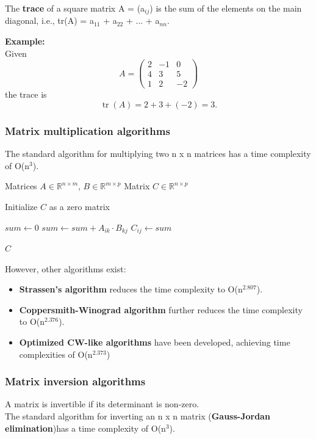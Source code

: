 \noindent
The \textbf{trace} of a square matrix A = (a$_{ij}$) is the sum of the elements on the main diagonal, i.e., tr(A) = a$_{11}$ + a$_{22}$ + ... + a$_{nn}$.
\medskip

\noindent
\textbf{Example:}\\
Given 
\[
A = \begin{pmatrix}
2 & -1 & 0\\
4 & 3 & 5\\
1 & 2 & -2
\end{pmatrix}
\]
the trace is
\[
\operatorname{tr}(A) = 2 + 3 + (-2) = 3.
\]

\subsubsection{Matrix multiplication algorithms}
The standard algorithm for multiplying two n x n matrices has a time complexity of O(n$^3$).
\begin{algorithm}
\caption{Schoolbook Matrix Multiplication}
\begin{algorithmic}[1]

\Require Matrices $A \in \mathbb{R}^{n \times m}$, $B \in \mathbb{R}^{m \times p}$
\Ensure Matrix $C \in \mathbb{R}^{n \times p}$

\State Initialize $C$ as a zero matrix

        \State $sum \gets 0$
            \State $sum \gets sum + A_{ik} \cdot B_{kj}$
        \EndFor
        \State $C_{ij} \gets sum$
    \EndFor
\EndFor

\State \Return $C$

\end{algorithmic}
\end{algorithm}

\noindent
However, other algorithms exist:
\begin{itemize}
    \item \textbf{Strassen's algorithm} reduces the time complexity to O(n$^{2.807}$).\\
    \item \textbf{Coppersmith-Winograd algorithm} further reduces the time complexity to O(n$^{2.376}$).\\
    \item \textbf{Optimized CW-like algorithms} have been developed, achieving time complexities of O(n$^{2.373}$) 
\end{itemize}


\subsubsection{Matrix inversion algorithms}
A matrix is invertible if its determinant is non-zero.\\
The standard algorithm for inverting an n x n matrix (\textbf{Gauss-Jordan elimination})has a time complexity of O(n$^3$).

